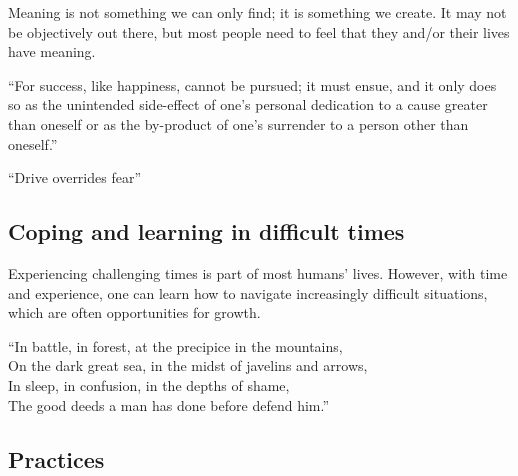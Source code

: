 \documentclass{article}
\begin{document}
Meaning is not something we can only find; it is something we create. It may not be objectively out there, but most people need to feel that they and/or their lives have meaning.

\vspace{1cm}
{``For success, like happiness, cannot be pursued; it must ensue, and it only does so as the unintended side-effect of one’s personal dedication to a cause greater than oneself or as the by-product of one’s surrender to a person other than oneself.''
\\[5pt]
}


\vspace{1cm}
{``Drive overrides fear''
\\[5pt]
}

\subsection{Coping and learning in difficult times}

Experiencing challenging times is part of most humans' lives. However, with time and experience, one can learn how to navigate increasingly difficult situations, which are often opportunities for growth.

\vspace{1cm}
{``In battle, in forest, at the precipice in the mountains, \\
On the dark great sea, in the midst of javelins and arrows, \\
In sleep, in confusion, in the depths of shame, \\
The good deeds a man has done before defend him.''
\\[5pt]
}




\subsection{Practices}
\end{document}
